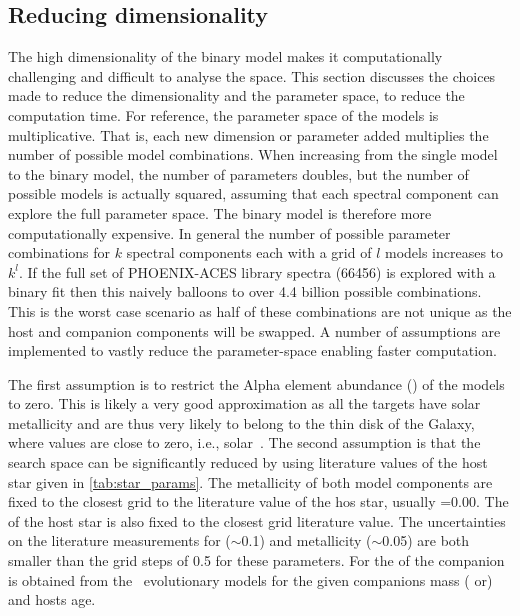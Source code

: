 \subsection{Reducing dimensionality}
\label{subsec:reduce-params}
The high dimensionality of the binary model makes it computationally challenging and difficult to analyse the \textchisquared{} space.
This section discusses the choices made to reduce the dimensionality and the parameter space, to reduce the computation time.
For reference, the parameter space of the models is multiplicative.
That is, each new dimension or parameter added multiplies the number of possible model combinations.
When increasing from the single model to the binary model, the number of parameters doubles, but the number of possible models is actually squared, assuming that each spectral component can explore the full parameter space.
The binary model is therefore more computationally expensive.
In general the number of possible parameter combinations for \(k\) spectral components each with a grid of \(l\) models increases to \({k}^{l}\).
If the full set of {PHOENIX-ACES} library spectra (66456) is explored with a binary fit then this naively balloons to over 4.4 billion possible combinations.
This is the worst case scenario as half of these combinations are not unique as the host and companion components will be swapped.
A number of assumptions are implemented to vastly reduce the parameter-space enabling faster computation.

The first assumption is to restrict the Alpha element abundance (\alphafe{}) of the models to zero.
This is likely a very good approximation as all the targets have solar metallicity and are thus very likely to belong to the thin disk of the Galaxy, where \alphafe{} values are close to zero, i.e., solar~\citet[e.g.][]{adibekyan_chemical_2012}.
The second assumption is that the search space can be significantly reduced by using literature values of the host star given in \cref{tab:star_params}.
The metallicity of both model components are fixed to the closest grid to the literature value of the hos star, usually \feh{}=0.00.
The \logg{} of the host star is also fixed to the closest grid literature value.
The uncertainties on the literature measurements for \logg{} (\(\sim\)0.1) and metallicity (\(\sim\)0.05) are both smaller than the grid steps of 0.5 for these parameters.
For the \logg{} of the companion is obtained from the~\citet{baraffe_evolutionary_2003,baraffe_new_2015} evolutionary models for the given companions mass (\Mtwo{} or\Mtwosini{}) and hosts age.

